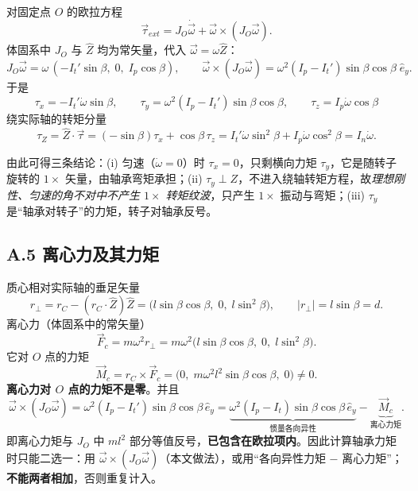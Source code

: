 \documentclass[11pt,a4paper]{article}
\theoremstyle{remark}\newtheorem{remark}{注}
\begin{document}
对固定点 $O$ 的欧拉方程
\begin{equation}
\vec\tau_{ext}=J_O\dot{\vec\omega}+\vec\omega\times(J_O\vec\omega).
\label{eq:app-euler}
\end{equation}
体固系中 $J_O$ 与 $\hat Z$ 均为常矢量，代入 $\vec\omega=\omega\hat Z$：
\begin{equation}
J_O\vec\omega=\omega\,(-I_t'\sin\beta,\;0,\;I_p\cos\beta),
\qquad
\vec\omega\times(J_O\vec\omega)
=\omega^2(I_p-I_t')\sin\beta\cos\beta\;\hat e_y .
\end{equation}
于是
\begin{equation}
\boxed{\;\tau_x=-I_t'\dot\omega\sin\beta,\qquad
\tau_y=\omega^2(I_p-I_t')\sin\beta\cos\beta,\qquad
\tau_z=I_p\dot\omega\cos\beta\;}
\label{eq:app-tau}
\end{equation}
绕实际轴的转矩分量
\begin{equation}
\tau_Z=\hat Z\cdot\vec\tau
=(-\sin\beta)\tau_x+\cos\beta\,\tau_z
=I_t'\dot\omega\sin^2\beta+I_p\dot\omega\cos^2\beta
=I_n\dot\omega .
\label{eq:app-tauZ}
\end{equation}

由此可得三条结论：(i) 匀速（$\dot\omega=0$）时 $\tau_x=0$，只剩横向力矩 $\tau_y$，它是随转子旋转的 $1\times$ 矢量，由轴承弯矩承担；(ii) $\tau_y\perp Z$，不进入绕轴转矩方程，故\emph{理想刚性、匀速的角不对中不产生 $1\times$ 转矩纹波}，只产生 $1\times$ 振动与弯矩；(iii) $\tau_y$ 是“轴承对转子”的力矩，转子对轴承反号。

\subsection*{A.5 离心力及其力矩}

质心相对实际轴的垂足矢量
\begin{equation}
r_\perp=r_C-(r_C\cdot\hat Z)\hat Z
=\bigl(l\sin\beta\cos\beta,\;0,\;l\sin^2\beta\bigr),
\qquad |r_\perp|=l\sin\beta=d .
\end{equation}
离心力（体固系中的常矢量）
\begin{equation}
\vec F_c=m\omega^2r_\perp
=m\omega^2\bigl(l\sin\beta\cos\beta,\;0,\;l\sin^2\beta\bigr).
\end{equation}
它对 $O$ 点的力矩
\begin{equation}
\vec M_c=r_C\times\vec F_c
=\bigl(0,\;m\omega^2l^2\sin\beta\cos\beta,\;0\bigr)\neq0 .
\label{eq:app-Mc}
\end{equation}
\textbf{离心力对 $O$ 点的力矩不是零}。并且
\begin{equation}
\vec\omega\times(J_O\vec\omega)
=\omega^2(I_p-I_t')\sin\beta\cos\beta\,\hat e_y
=\underbrace{\omega^2(I_p-I_t)\sin\beta\cos\beta\,\hat e_y}_{\text{惯量各向异性}}
-\underbrace{\vec M_c}_{\text{离心力矩}} .
\label{eq:app-split}
\end{equation}
即离心力矩与 $J_O$ 中 $ml^2$ 部分等值反号，\textbf{已包含在欧拉项内}。因此计算轴承力矩时只能二选一：用 $\vec\omega\times(J_O\vec\omega)$（本文做法），或用“各向异性力矩 $-$ 离心力矩”；\textbf{不能两者相加}，否则重复计入。
\end{document}
